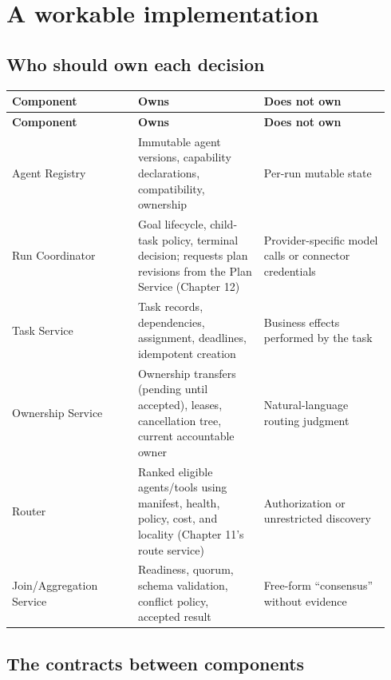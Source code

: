 \section{A workable implementation}

\subsection{Who should own each decision}

\BookTableStart
\small
\begin{longtable}{@{}Y{0.3133\linewidth}Y{0.3133\linewidth}Y{0.3133\linewidth}@{}}
\color{white}\bfseries \textbf{Component} & \color{white}\bfseries \textbf{Owns} & \color{white}\bfseries \textbf{Does not own} \\
\endfirsthead
{}
\color{white}\bfseries \textbf{Component} & \color{white}\bfseries \textbf{Owns} & \color{white}\bfseries \textbf{Does not own} \\
\endhead
Agent Registry & Immutable agent versions, capability declarations, compatibility, ownership & Per-run mutable state \\
Run Coordinator & Goal lifecycle, child-task policy, terminal decision; requests plan revisions from the Plan Service (Chapter 12) & Provider-specific model calls or connector credentials \\
Task Service & Task records, dependencies, assignment, deadlines, idempotent creation & Business effects performed by the task \\
Ownership Service & Ownership transfers (pending until accepted), leases, cancellation tree, current accountable owner & Natural-language routing judgment \\
Router & Ranked eligible agents/tools using manifest, health, policy, cost, and locality (Chapter 11's route service) & Authorization or unrestricted discovery \\
Join/Aggregation Service & Readiness, quorum, schema validation, conflict policy, accepted result & Free-form “consensus” without evidence \\
\end{longtable}
\BookTableEnd

\subsection{The contracts between components}

